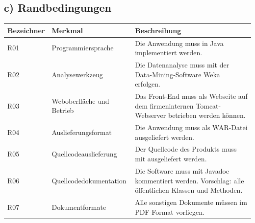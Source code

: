 \documentclass[a4paper,10pt]{article}
\begin{document}
        \subsection*{c) Randbedingungen}
        \begin{longtable}{>{\raggedright\arraybackslash}p{}>{\raggedright\arraybackslash}p{}>{\raggedright\arraybackslash}p{}}

            \toprule
            \textbf{Bezeichner} & \textbf{Merkmal}              & \textbf{Beschreibung}                                                                                                                              \\
            \midrule\endhead
            \bottomrule\endfoot
            R01                 & Programmiersprache            & Die Anwendung muss in Java implementiert werden.                                                                                                   \\
            \midrule
            R02                 & Analysewerkzeug               & Die Datenanalyse muss mit der Data-Mining-Software Weka erfolgen.                                                                                  \\
            \midrule
            R03                 & Weboberfläche und Betrieb     & Das Front-End muss als Webseite auf dem firmeninternen Tomcat-Webserver betrieben werden können.                                                   \\
            \midrule
            R04                 & Auslieferungsformat           & Die Anwendung muss als WAR-Datei ausgeliefert werden.                                                                                              \\
            \midrule
            R05                 & Quellcodeauslieferung         & Der Quellcode des Produkts muss mit ausgeliefert werden.                                                                                           \\
            \midrule
            R06                 & Quellcodedokumentation        & Die Software muss mit Javadoc kommentiert werden. Vorschlag: alle öffentlichen Klassen und Methoden.                                               \\
            \midrule
            R07                 & Dokumentformate               & Alle sonstigen Dokumente müssen im PDF-Format vorliegen.                                                                                           \\

\end{longtable}
\end{document}
